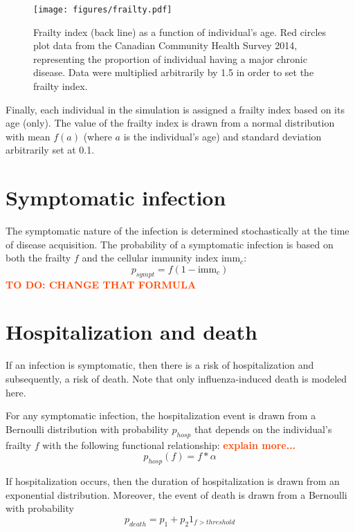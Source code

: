 \documentclass[11pt, onecolumn]{article}
\newcommand{\warning}[1]{\textbf{\textcolor{OrangeRed}{#1}}}
\newcommand{\immc}{\ensuremath{\text{imm}_c}}
\begin{document}
\begin{figure}[!ht]
\centering
    \texttt{[image: figures/frailty.pdf]}
\caption{Frailty index (back line) as a function of individual's age. Red circles plot data from the Canadian Community Health Survey 2014, representing the proportion of individual having a major chronic disease. Data were multiplied arbitrarily by 1.5 in order to set the frailty index.}
\label{fig:frailty}
\end{figure}

Finally, each individual in the simulation is assigned a frailty index based on its age (only). The value of the frailty index is drawn from a normal distribution with mean $f(a)$ (where $a$ is the individual's age) and standard deviation arbitrarily set at 0.1.

\section{Symptomatic infection}

The symptomatic nature of the infection is determined stochastically at the time of disease acquisition. The probability of a symptomatic infection is based on both the frailty $f$ and the cellular immunity index $\immc$:
\begin{equation}
p_{sympt} = f (1-\immc)
\end{equation}
\warning{TO DO: CHANGE THAT FORMULA}


\section{Hospitalization and death}

If an infection is symptomatic, then there is a risk of hospitalization and subsequently, a risk of death. Note that only influenza-induced death is modeled here.

For any symptomatic infection, the hospitalization event is drawn from a Bernoulli distribution with probability $p_{hosp}$ that depends on the individual's frailty $f$ with the following functional relationship: \warning{explain more...}
\begin{equation}
p_{hosp}(f) = f * \alpha 
\end{equation}

If hospitalization occurs, then the duration of hospitalization is drawn from an exponential distribution. Moreover, the event of death is drawn from a Bernoulli with probability 
\begin{equation}
p_{death} = p_1 + p_2 1_{f>threshold}
\end{equation}
\end{document}
